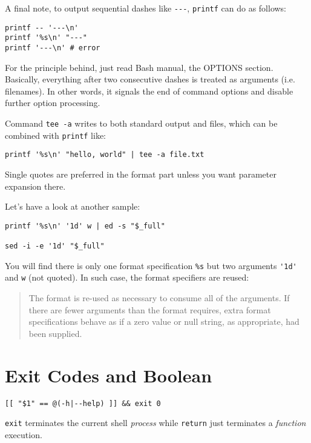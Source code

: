 A final note, to output sequential dashes like \verb|---|,
\lstinline|printf| can do as follows:

\begin{lstlisting}
printf -- '---\n'
printf '%s\n' "---"
printf '---\n' # error
\end{lstlisting}

For the principle behind, just read Bash manual, the OPTIONS
section. Basically, everything after two consecutive dashes is
treated as arguments (i.e. filenames). In other words, it signals the
end of command options and disable further option processing.

Command \lstinline|tee -a| writes to both standard output and
files, which can be combined with \lstinline|printf| like:

\begin{lstlisting}
printf '%s\n' "hello, world" | tee -a file.txt
\end{lstlisting}

Single quotes are preferred in the format part unless you want
parameter expansion there.

Let's have a look at another sample:

\begin{lstlisting}
printf '%s\n' '1d' w | ed -s "$_full"

sed -i -e '1d' "$_full"
\end{lstlisting}

You will find there is only one format specification \verb|%s| but
two arguments \verb|'1d'| and \verb|w| (not quoted). In such case,
the format specifiers are reused:

\begin{quotation}
  The format is re-used as necessary to consume all of the
  arguments. If there are fewer arguments than the format
  requires, extra format specifications behave as if a zero value
  or null string, as appropriate, had been supplied.
\end{quotation}

\section{Exit Codes and Boolean}
\label{sec:exit-codes-boolean}

\begin{lstlisting}
[[ "$1" == @(-h|--help) ]] && exit 0
\end{lstlisting}

\lstinline|exit| terminates the current shell \textit{process}
while \lstinline|return| just terminates a \textit{function}
execution.

